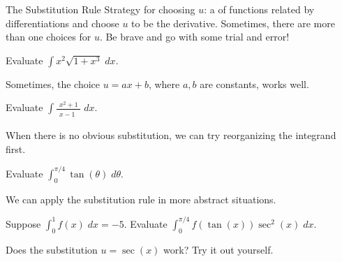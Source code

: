 \documentclass[../main.tex]{subfiles}
\begin{document}
\begin{lesson}{The Substitution Rule}
  Strategy for choosing \(u\):  a  of functions related by differentiations and choose \(u\) to be the derivative.  Sometimes, there are more than one choices for \(u\). Be brave and go with some trial and error!
  \begin{example}
    Evaluate \(\int x^{2} \sqrt{1 + x^{3}} \;dx\).
  \end{example}

  Sometimes, the choice \(u = ax + b\), where \(a,b\) are constants, works well. 
  \begin{example}
    Evaluate $\int \frac{x^{2} + 1}{\phantom{(} x - 1 \phantom{)^{1}}} \;dx$.
  \end{example}

  When there is no obvious substitution, we can try reorganizing the integrand first.
  \begin{example}
    Evaluate \(\int_{0}^{\pi/4} \tan(\theta) \;d\theta\).
  \end{example}

  We can apply the substitution rule in more abstract situations. 
  \begin{example}
    Suppose \(\int_{0}^{1} f(x) \;dx = -5\). Evaluate \(\int_{0}^{\pi/4} f(\tan(x)) \sec^{2}(x) \;dx\).
  \end{example}
  
  \faComment{} Does the substitution \(u = \sec(x)\) work? Try it out yourself.
\end{lesson}
\end{document}
